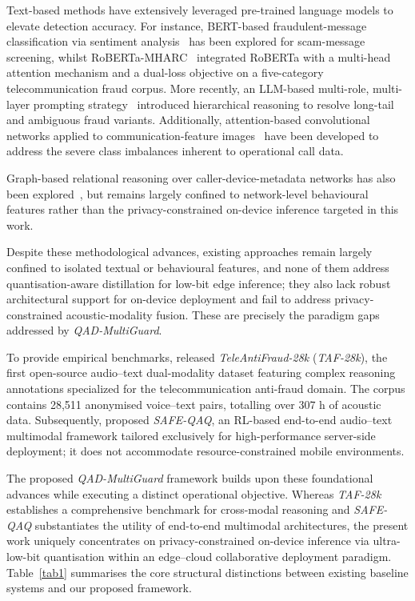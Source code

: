\documentclass[a4paper,fleqn]{cas-sc}
\begin{document}
Text-based methods have extensively leveraged pre-trained language models to elevate detection accuracy. For instance, BERT-based fraudulent-message classification via sentiment analysis~\citep{16} has been explored for scam-message screening, whilst RoBERTa-MHARC~\citep{liRobertaMHARC2024} integrated RoBERTa with a multi-head attention mechanism and a dual-loss objective on a five-category telecommunication fraud corpus. More recently, an LLM-based multi-role, multi-layer prompting strategy~\citep{mrml2026} introduced hierarchical reasoning to resolve long-tail and ambiguous fraud variants. Additionally, attention-based convolutional networks applied to communication-feature images~\citep{liImageCNN2025} have been developed to address the severe class imbalances inherent to operational call data.

Graph-based relational reasoning over caller-device-metadata networks has also been explored~\citep{papasavva2025,MotieESWA2024,RenESWA2024}, but remains largely confined to network-level behavioural features rather than the privacy-constrained on-device inference targeted in this work.

Despite these methodological advances, existing approaches remain largely confined to isolated textual or behavioural features, and none of them address quantisation-aware distillation for low-bit edge inference; they also lack robust architectural support for on-device deployment and fail to address privacy-constrained acoustic-modality fusion. These are precisely the paradigm gaps addressed by \textit{QAD-MultiGuard}.

To provide empirical benchmarks, \citet{1} released \textit{TeleAntiFraud-28k} (\textit{TAF-28k}), the first open-source audio--text dual-modality dataset featuring complex reasoning annotations specialized for the telecommunication anti-fraud domain. The corpus contains 28,511 anonymised voice--text pairs, totalling over $307\text{~h}$ of acoustic data. Subsequently, \citet{2} proposed \textit{SAFE-QAQ}, an RL-based end-to-end audio--text multimodal framework tailored exclusively for high-performance server-side deployment; it does not accommodate resource-constrained mobile environments.

The proposed \textit{QAD-MultiGuard} framework builds upon these foundational advances while executing a distinct operational objective. Whereas \textit{TAF-28k} establishes a comprehensive benchmark for cross-modal reasoning and \textit{SAFE-QAQ} substantiates the utility of end-to-end multimodal architectures, the present work uniquely concentrates on privacy-constrained on-device inference via ultra-low-bit quantisation within an edge--cloud collaborative deployment paradigm. Table~\ref{tab1} summarises the core structural distinctions between existing baseline systems and our proposed framework.
\end{document}
